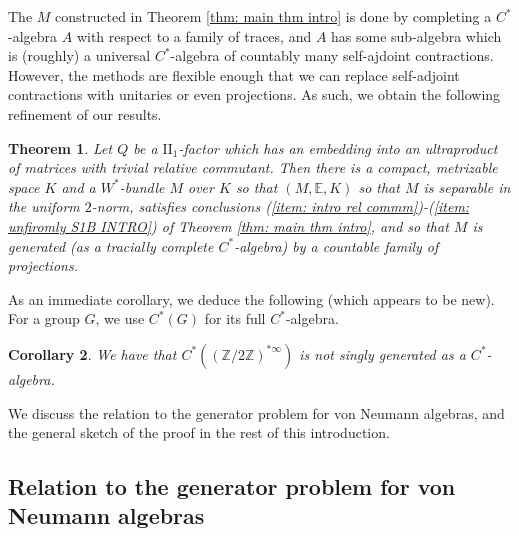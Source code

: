 \documentclass[10pt]{amsart}
\newtheorem{thm}{Theorem}[section]
\newtheorem{cor}[thm]{Corollary}
\theoremstyle{definition}
\numberwithin{equation}{section}
\newcommand{\bE}{{\mathbb E}}
\newcommand{\bZ}{{\mathbb Z}}
\begin{document}
The $M$ constructed in Theorem \ref{thm: main thm intro} is done by completing a $C^{*}$-algebra $A$ with respect to a family of traces, and $A$ has some sub-algebra which is (roughly) a universal $C^{*}$-algebra of countably many self-ajdoint contractions. However, the methods are flexible enough that we can replace self-adjoint contractions with unitaries or even projections. As such, we obtain the following refinement of our results.
\begin{thm}\label{thm: main theorem intro but with projections}
Let $Q$ be a $\textrm{II}_{1}$-factor which has an embedding into an ultraproduct of matrices with trivial relative commutant. Then there is a compact, metrizable space $K$ and a $W^{*}$-bundle $M$ over $K$ so that $(M,\bE,K)$ so that $M$ is separable in the uniform $2$-norm,  satisfies conclusions (\ref{item: intro rel commm})-(\ref{item: unfiromly S1B INTRO}) of Theorem \ref{thm: main thm intro}, and so that $M$ is generated (as a tracially complete $C^{*}$-algebra) by a countable family of projections.
\end{thm}

As an immediate corollary, we deduce the following (which appears to be new). For a group $G$, we use $C^{*}(G)$ for its full $C^{*}$-algebra. 

\begin{cor}
We have that $C^{*}((\bZ/2\bZ)^{*\infty})$ is not singly generated as a $C^{*}$-algebra. 
\end{cor}



We discuss the relation to the generator problem for von Neumann algebras, and the general sketch of the proof in the rest of this introduction.

\subsection*{Relation to the generator problem for von Neumann algebras}
\end{document}
